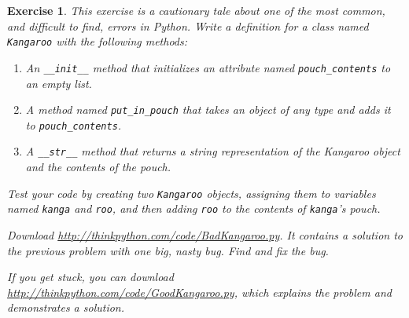\documentclass[12pt,a4paper,final,twoside,onecolumn,titlepage]{book}
\newtheorem{exercise}{Exercise}[chapter]
\begin{document}
\begin{exercise}

This exercise is a cautionary tale about one of the most
common, and difficult to find, errors in Python.
Write a definition for a class named {\tt Kangaroo} with the following
methods:

\begin{enumerate}

\item An \verb"__init__" method that initializes an attribute named 
\verb"pouch_contents" to an empty list.

\item A method named \verb"put_in_pouch" that takes an object
of any type and adds it to \verb"pouch_contents".

\item A \verb"__str__" method that returns a string representation
of the Kangaroo object and the contents of the pouch.

\end{enumerate}
%
Test your code 
by creating two {\tt Kangaroo} objects, assigning them to variables
named {\tt kanga} and {\tt roo}, and then adding {\tt roo} to the
contents of {\tt kanga}'s pouch.

Download \url{http://thinkpython.com/code/BadKangaroo.py}.  It contains
a solution to the previous problem with one big, nasty bug.
Find and fix the bug.

If you get stuck, you can download
\url{http://thinkpython.com/code/GoodKangaroo.py}, which explains the
problem and demonstrates a solution.

\end{exercise}
\end{document}
